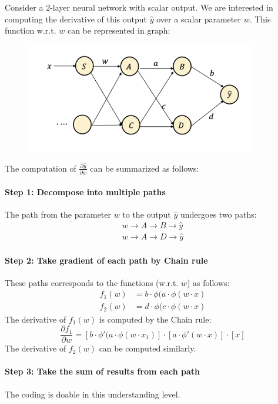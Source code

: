 \begin{example}
Consider a $2$-layer neural network with scalar output. We are interested in computing the derivative of this output $\hat{y}$ over a scalar parameter $w$.
This function w.r.t. $w$ can be represented in graph:
\begin{figure}[H]
\centering
\includegraphics[width=0.9\textwidth]{Second_lecture/p_2}
\end{figure}
The computation of $\frac{\partial{\hat{y}}}{\partial{w}}$ can be summarized as follows:
\paragraph{Step 1: Decompose into multiple paths}
The path from the parameter $w$ to the output $\hat{y}$ undergoes two paths:
\[
\begin{array}{c}
w\to A\to B\to \hat{y}\\
w\to A\to D\to \hat{y}
\end{array}
\]
\paragraph{Step 2: Take gradient of each path by Chain rule}
These paths corresponds to the functions (w.r.t. $w$) as follows:
\begin{align*}
f_1(w)&=b\cdot\phi(a\cdot\phi(w\cdot x)\\
f_2(w)&=d\cdot\phi(c\cdot\phi(w\cdot x)
\end{align*}
The derivative of $f_1(w)$ is computed by the Chain rule:
\[
\frac{\partial f_1}{\partial w} = [b\cdot\phi'(a\cdot\phi(w\cdot x_1)]\cdot[a\cdot \phi'(w\cdot x)]\cdot [x]
\]
The derivative of $f_2(w)$ can be computed similarly.

\paragraph{Step 3: Take the sum of results from each path}
\end{example}
The coding is doable in this understanding level.

